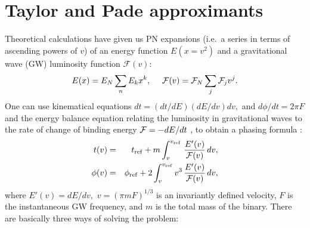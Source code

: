 \section{Taylor and Pade approximants} 
Theoretical calculations have given us PN expansions 
(i.e.\ a series in terms of ascending powers of $v$) of an energy 
function $E(x=v^2)$ and a gravitational wave (GW) luminosity 
function $\mathcal{F}(v):$
\begin{equation}
E(x) = E_N \sum_n E_k x^k,\ \ \ \ {\cal F}(v) = {\cal F}_N \sum_j {\cal F}_j v^j.
\end{equation}
One can use kinematical equations $dt = (dt/dE)(dE/dv) dv,$ and 
$d\phi/dt = 2\pi F$ and the energy balance equation relating the
luminosity in gravitational waves to the rate of change of
binding energy ${\cal F} = - dE/dt$ , to obtain a phasing formula \cite {dis3}:
\begin{eqnarray}
t(v) & = & t_{\rm ref} + m \int_v^{v_{\rm ref}} \,
\frac{E'(v)}{{\cal F}(v)} \, dv, \nonumber \\
\phi (v) & = & \phi_{\rm ref} + 2 \int_v^{v_{\rm ref}}  v^3 \,
\frac{E'(v)}{{\cal F}(v)} \, dv,
\label{InspiralWavePhasingFormula}
\end{eqnarray}
where $E'(v)=dE/dv,$ $v=(\pi m F)^{1/3}$ is an invariantly defined velocity, 
$F$ is the instantaneous GW frequency, and $m$ is the total mass 
of the binary.  There are basically three ways of solving the problem:
